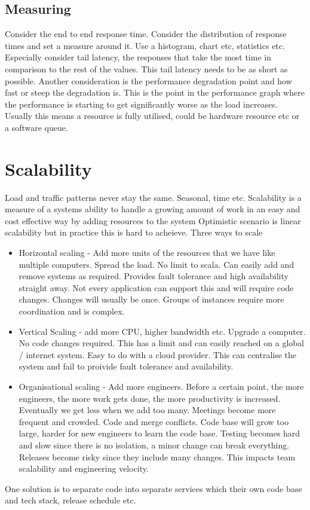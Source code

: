 \documentclass[a4paper, 11pt]{book}
\begin{document}
    \subsection{Measuring}
    Consider the end to end response time.
    Consider the distribution of response times and set a measure around it.
    Use a histogram, chart etc, statistics etc.
    Especially consider tail latency, the responses that take the most time in comparison to the rest of the values.
    This tail latency needs to be as short as possible.
    Another consideration is the performance degradation point and how fast or steep the degradation is.
    This is the point in the performance graph where the performance is starting to get significantly worse as the load increases.
    Usually this means a resource is fully utilised, could be hardware resource etc or a software queue.


    \section{Scalability}
    Load and traffic patterns never stay the same.
    Seasonal, time etc.
    Scalability is a measure of a systems ability to handle a growing amount of work in an easy and cost effective way by adding resources to the system
    Optimistic scenario is linear scalability but in practice this is hard to acheieve.
    Three ways to scale
    \begin{itemize}
        \item Horizontal scaling - Add more units of the resources that we have like multiple computers.
        Spread the load.
        No limit to scala.
        Can easily add and remove systems as required.
        Provides fault tolerance and high availability straight away.
        Not every application can support this and will require code changes.
        Changes will usually be once.
        Groups of instances require more coordination and is complex.
        \item Vertical Scaling - add more CPU, higher bandwidth etc.
        Upgrade a computer.
        No code changes required.
        This has a limit and can easily reached on a global / internet system. Easy to do with a cloud provider.
        This can centralise the system and fail to proivide fault tolerance and availability.
        \item Organisational scaling - Add more engineers.
        Before a certain point, the more engineers, the more work gets done, the more productivity is increased.
        Eventually we get less when we add too many.
        Meetings become more frequent and crowded.
        Code and merge conflicts.
        Code base will grow too large, harder for new engineers to learn the code base.
        Testing becomes hard and slow since there is no isolation, a minor change can break everything.
        Releases become risky since they include many changes.
        This impacts team scalability and engineering velocity.
    \end{itemize}
    One solution is to separate code into separate services which their own code base and tech stack, release schedule etc.
\end{document}

